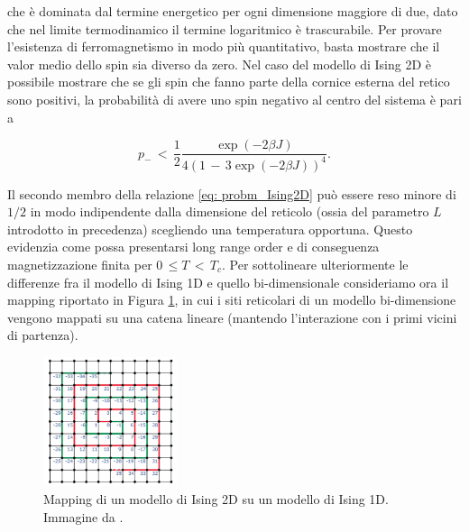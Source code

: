 che è dominata dal termine energetico per ogni dimensione maggiore di due, dato che nel limite termodinamico il termine 
logaritmico è trascurabile. Per provare l'esistenza di ferromagnetismo in modo più quantitativo, basta mostrare che il valor medio 
dello spin sia diverso da zero. Nel caso del modello di Ising 2D è possibile mostrare che se gli spin che fanno parte della cornice 
esterna del retico sono positivi, la probabilità di avere uno spin negativo al centro del sistema è pari a 

\begin{equation}
    p_{-}\,<\,\frac{1}{2}\frac{\exp{\left(-2\beta J\right)}}{4 \left(1\,-\,3\exp{\left(-2\beta J\right)}\right)^4}.
    \label{eq: probm_Ising2D}
\end{equation}

Il secondo membro della relazione \eqref{eq: probm_Ising2D} può essere reso minore di $1/2$ in modo indipendente dalla dimensione del reticolo 
(ossia del parametro $L$ introdotto in precedenza) scegliendo una temperatura opportuna. Questo evidenzia come possa 
presentarsi long range order e di conseguenza magnetizzazione finita per $0\,\leq T\,<\,T_c$. Per sottolineare ulteriormente le 
differenze fra il modello di Ising 1D e quello bi-dimensionale consideriamo ora il mapping riportato in Figura \ref{fig: map_2to1_Ising}, 
in cui i siti reticolari di un modello bi-dimensione vengono mappati su una catena lineare (mantendo l'interazione con i primi 
vicini di partenza).

\begin{figure}[H]
    \centering
    \includegraphics[width=0.35\textwidth]{Immagini/map_2to1_Ising.png}
    \caption{Mapping di un modello di Ising 2D su un modello di Ising 1D. Immagine da \cite{galliFSA}.}
    \label{fig: map_2to1_Ising}
\end{figure}

